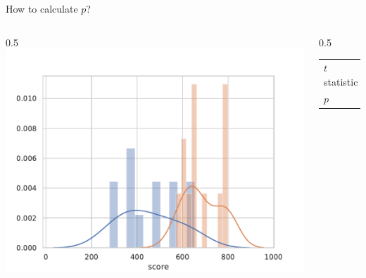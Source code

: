 \documentclass[compress]{beamer}
\begin{document}
\begin{frame}{How to calculate $p$?}
{\begin{columns}
\begin{column}{0.5\linewidth}
            \includegraphics[width=\columnwidth]{code/distributions3.pdf}
        \end{column}
        \begin{column}{0.5\linewidth}

        \begin{tabular}{@{}ll@{}}
    \toprule
    $t$ statistic & -5.41                 \\
    $p$ & $<0.001$              \\ \bottomrule
    \end{tabular}
        \end{column}
    \end{columns}

    }

\end{frame}
\end{document}
